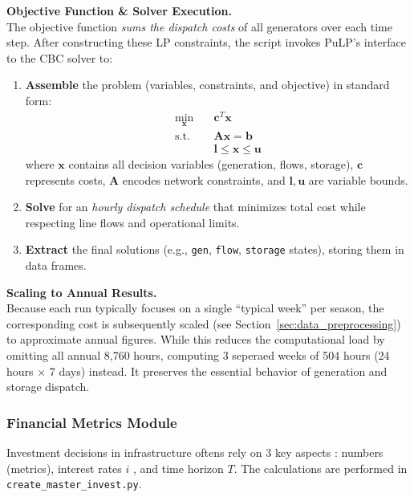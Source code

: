 \textbf{Objective Function \& Solver Execution.}\\
The objective function \emph{sums the dispatch costs} of all generators over each time step. After constructing 
these LP constraints, the script invokes PuLP’s  interface to the CBC solver to:
\begin{enumerate}
    \item \textbf{Assemble} the problem (variables, constraints, and objective) in standard form:
    \begin{equation*}
    \begin{aligned}
    \min_{\mathbf{x}} \quad & \mathbf{c}^T\mathbf{x} \\
    \text{s.t.} \quad & \mathbf{A}\mathbf{x} = \mathbf{b} \\
    & \mathbf{l} \leq \mathbf{x} \leq \mathbf{u}
    \end{aligned}
    \end{equation*}
    where $\mathbf{x}$ contains all decision variables (generation, flows, storage), $\mathbf{c}$ represents costs, 
    $\mathbf{A}$ encodes network constraints, and $\mathbf{l},\mathbf{u}$ are variable bounds.
    \item \textbf{Solve} for an \textit{hourly dispatch schedule} that minimizes total cost while respecting line 
    flows and operational limits.
    \item \textbf{Extract} the final solutions (e.g., \texttt{gen}, \texttt{flow}, \texttt{storage} states), storing
    them in data frames.
\end{enumerate}

\textbf{Scaling to Annual Results.}\\
Because each run typically focuses on a single “typical week” per season, the corresponding cost is subsequently 
scaled (see Section~\ref{sec:data_preprocessing}) to approximate annual figures. While this reduces the 
computational load by omitting all annual 8,760 hours, computing 3 seperaed weeks of 504 hours (24 hours $\times$ 
7 days) instead. It preserves the essential behavior of generation and storage dispatch.


\subsubsection{Financial Metrics Module}
Investment decisions in infrastructure oftens rely on 3 key aspects : numbers (metrics), interest rates $i$ , 
and time horizon $T$. The calculations are performed in \texttt{create\_master\_invest.py}.

